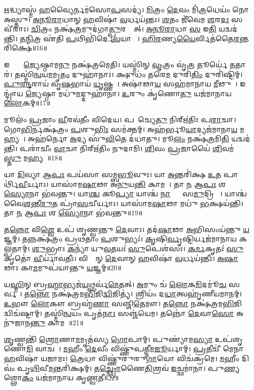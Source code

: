 \ul{𑌋}𑌦𑍍𑌧𑍍𑌯𑌾𑌸𑍍𑌮॑ \ul{𑌹}𑌵𑍍𑌯𑍈𑌰𑍍𑌨𑌮॑𑌸𑍋\ul{𑌪}𑌸𑌦𑍍𑌯॑। 
\ul{𑌮𑌿}𑌤𑍍𑌰𑌂 \ul{𑌦𑍇}𑌵𑌂 𑌮𑌿॑\ul{𑌤𑍍𑌰}𑌧𑍇𑌯𑌂॑ 𑌨𑍋 𑌅𑌸𑍍𑌤𑍁। 
\ul{𑌅}\ul{𑌨𑍂}\ul{𑌰𑌾}𑌧𑌾𑌨𑍍 \ul{𑌹}𑌵𑌿𑌷𑌾॑ \ul{𑌵}𑌰𑍍𑌧𑌯॑𑌨𑍍𑌤𑌃। 
\ul{𑌶}𑌤𑌂 𑌜𑍀॑𑌵𑍇𑌮 \ul{𑌶}𑌰\ul{𑌦𑌃} 𑌸𑌵𑍀॑𑌰𑌾𑌃। 
\ul{𑌚𑌿}𑌤𑍍𑌰𑌂 𑌨𑌕𑍍𑌷॑\ul{𑌤𑍍𑌰}𑌮𑍁𑌦॑𑌗𑌾\ul{𑌤𑍍𑌪𑍁}𑌰𑌸𑍍𑌤𑌾᳚𑌤𑍍। 
\ul{𑌅}\ul{𑌨𑍂}\ul{𑌰𑌾}𑌧𑌾 \ul{𑌸} 𑌇\ul{𑌤𑌿} 𑌯𑌦𑍍𑌵𑌦॑𑌨𑍍𑌤𑌿। 
𑌤\ul{𑌨𑍍𑌮𑌿}𑌤𑍍𑌰 𑌏॑𑌤𑌿 \ul{𑌪}𑌥𑌿𑌭𑌿॑𑌰𑍍𑌦𑍇\ul{𑌵}𑌯𑌾𑌨𑍈𑌃᳚। 
\ul{𑌹𑌿}\ul{𑌰}𑌣𑍍𑌯\ul{𑌯𑍈}𑌰𑍍𑌵𑌿𑌤॑𑌤𑍈\-\ul{𑌰}𑌨𑍍𑌤𑌰𑌿॑𑌕𑍍𑌷𑍇॥16॥ 

𑌇𑌨𑍍𑌦𑍍𑌰𑍋᳚ \ul{𑌜𑍍𑌯𑍇}𑌷𑍍𑌠𑌾𑌮\ul{𑌨𑍁} 𑌨𑌕𑍍𑌷॑𑌤𑍍𑌰𑌮𑍇𑌤𑌿। 
𑌯𑌸𑍍𑌮𑌿॑𑌨𑍍 \ul{𑌵𑍃}𑌤𑍍𑌰𑌂 𑌵𑍃॑\ul{𑌤𑍍𑌰} 𑌤𑍂𑌰𑍍𑌯𑍇॑ \ul{𑌤}𑌤𑌾𑌰॑। 
𑌤𑌸𑍍𑌮𑌿॑\ul{𑌨𑍍𑌵}𑌯\ul{𑌮}𑌮𑍃\ul{𑌤𑌂} 𑌦𑍁𑌹𑌾॑𑌨𑌾𑌃। 
𑌕𑍍𑌷𑍁𑌧𑌂॑ 𑌤𑌰𑍇\ul{𑌮} 𑌦𑍁𑌰𑌿॑\ul{𑌤𑌿𑌂} 𑌦𑍁𑌰𑌿॑𑌷𑍍𑌟𑌿𑌮𑍍। 
\ul{𑌪𑍁}\ul{𑌰}\ul{𑌨𑍍𑌦}𑌰𑌾𑌯॑ 𑌵𑍃\ul{𑌷}𑌭𑌾𑌯॑ \ul{𑌧𑍃}𑌷𑍍𑌣𑌵𑍇᳚। 
𑌅𑌷𑌾॑𑌢𑌾\ul{𑌯} 𑌸𑌹॑𑌮𑌾𑌨𑌾𑌯 \ul{𑌮𑍀}𑌢𑍁𑌷𑍇᳚। 
𑌇𑌨𑍍𑌦𑍍𑌰𑌾॑𑌯 \ul{𑌜𑍍𑌯𑍇}𑌷𑍍𑌠𑌾 𑌮𑌧𑍁॑\ul{𑌮}𑌦𑍍𑌦𑍁𑌹𑌾॑𑌨𑌾। 
\ul{𑌉}𑌰𑍁𑌂 𑌕𑍃॑𑌣𑍋\ul{𑌤𑍁} 𑌯𑌜॑𑌮𑌾𑌨𑌾𑌯 \ul{𑌲𑍋}𑌕𑌮𑍍॥17॥ 

𑌮𑍂𑌲𑌂॑ \ul{𑌪𑍍𑌰}𑌜𑌾𑌂 \ul{𑌵𑍀}𑌰𑌵॑𑌤𑍀𑌂 𑌵𑌿𑌦𑍇𑌯। 
𑌪𑌰𑌾᳚𑌚𑍍𑌯𑍇\ul{𑌤𑍁} 𑌨𑌿𑌰𑍍𑌋॑𑌤𑌿𑌃 𑌪\ul{𑌰𑌾}𑌚𑌾। 
𑌗𑍋\ul{𑌭𑌿}𑌰𑍍𑌨𑌕𑍍𑌷॑𑌤𑍍𑌰𑌂 \ul{𑌪}𑌶𑍁\ul{𑌭𑌿𑌃} 𑌸𑌮॑𑌕𑍍𑌤𑌮𑍍। 
𑌅𑌹॑𑌰𑍍𑌭𑍂\ul{𑌯𑌾}𑌦𑍍𑌯𑌜॑𑌮𑌾𑌨𑌾\ul{𑌯} 𑌮𑌹𑍍𑌯𑌮𑍍᳚। 
𑌅𑌹॑𑌰𑍍𑌨𑍋 \ul{𑌅}𑌦𑍍𑌯 𑌸𑍁॑\ul{𑌵𑌿}𑌤𑍇 𑌦॑𑌧𑌾𑌤𑍁। 
𑌮𑍂\ul{𑌲𑌂} 𑌨𑌕𑍍𑌷॑\ul{𑌤𑍍𑌰}𑌮𑌿\ul{𑌤𑌿} 𑌯𑌦𑍍𑌵𑌦॑𑌨𑍍𑌤𑌿। 
𑌪𑌰𑌾॑𑌚𑍀𑌂 \ul{𑌵𑌾}𑌚𑌾 𑌨𑌿𑌰𑍍𑌋॑𑌤𑌿𑌂 𑌨𑍁𑌦𑌾𑌮𑌿। 
\ul{𑌶𑌿}𑌵𑌂 \ul{𑌪𑍍𑌰}𑌜𑌾𑌯𑍈॑ \ul{𑌶𑌿}𑌵𑌮॑\ul{𑌸𑍍𑌤𑍁} 𑌮𑌹𑍍𑌯𑌮𑍍᳚॥18॥ 

𑌯𑌾 \ul{𑌦𑌿}𑌵𑍍𑌯𑌾 𑌆\ul{𑌪𑌃} 𑌪𑌯॑𑌸𑌾 𑌸𑌮𑍍𑌬\ul{𑌭𑍂}𑌵𑍁𑌃। 
𑌯𑌾 \ul{𑌅}𑌨𑍍𑌤𑌰𑌿॑𑌕𑍍𑌷 \ul{𑌉}𑌤 𑌪𑌾𑌰𑍍𑌥𑌿॑\ul{𑌵𑍀}𑌰𑍍𑌯𑌾𑌃। 
𑌯𑌾𑌸𑌾॑𑌮\ul{𑌷𑌾}𑌢𑌾 𑌅॑\ul{𑌨𑍁}𑌯\ul{𑌨𑍍𑌤𑌿} 𑌕𑌾𑌮𑌮𑍍᳚। 
𑌤𑌾 \ul{𑌨} 𑌆\ul{𑌪𑌃} 𑌶 \ul{𑌸𑍍𑌯𑍋}𑌨𑌾 𑌭॑𑌵𑌨𑍍𑌤𑍁। 
𑌯𑌾\ul{𑌶𑍍𑌚} 𑌕𑍂\ul{𑌪𑍍𑌯𑌾} 𑌯𑌾𑌶𑍍𑌚॑ \ul{𑌨𑌾}𑌦𑍍𑌯𑌾𑌃᳚ 𑌸\ul{𑌮𑍁}𑌦𑍍𑌰𑌿𑌯𑌾𑌃᳚। 
𑌯𑌾𑌶𑍍𑌚॑ 𑌵𑍈\ul{𑌶}𑌨𑍍𑌤𑍀\ul{𑌰𑍁}𑌤 𑌪𑍍𑌰𑌾॑\ul{𑌸}𑌚𑍀𑌰𑍍𑌯𑌾𑌃। 
𑌯𑌾𑌸𑌾॑𑌮\ul{𑌷𑌾}𑌢𑌾 𑌮𑌧𑍁॑ \ul{𑌭}𑌕𑍍𑌷𑌯॑𑌨𑍍𑌤𑌿। 
𑌤𑌾 \ul{𑌨} 𑌆\ul{𑌪𑌃} 𑌶 \ul{𑌸𑍍𑌯𑍋}𑌨𑌾 𑌭॑𑌵𑌨𑍍𑌤𑍁॥19॥ 

𑌤\ul{𑌨𑍍𑌨𑍋} 𑌵𑌿\ul{𑌶𑍍𑌵𑍇} 𑌉𑌪॑ 𑌶𑍃𑌣𑍍𑌵𑌨𑍍𑌤𑍁 \ul{𑌦𑍇}𑌵𑌾𑌃। 
𑌤𑌦॑\ul{𑌷𑌾}𑌢𑌾 \ul{𑌅}𑌭𑌿𑌸𑌂𑌯॑𑌨𑍍𑌤𑍁 \ul{𑌯}𑌜𑍍𑌞𑌮𑍍। 
𑌤𑌨𑍍𑌨𑌕𑍍𑌷॑𑌤𑍍𑌰𑌂 𑌪𑍍𑌰𑌥𑌤𑌾𑌂 \ul{𑌪}𑌶𑍁𑌭𑍍𑌯𑌃॑। 
\ul{𑌕𑍃}𑌷𑌿\ul{𑌰𑍍𑌵𑍃}𑌷𑍍𑌟𑌿𑌰𑍍𑌯𑌜॑𑌮𑌾𑌨𑌾𑌯 𑌕𑌲𑍍𑌪𑌤𑌾𑌮𑍍। 
\ul{𑌶𑍁}𑌭𑍍𑌰𑌾𑌃 \ul{𑌕}𑌨𑍍𑌯𑌾॑ 𑌯𑍁\ul{𑌵}𑌤𑌯𑌃॑ \ul{𑌸𑍁}𑌪𑍇𑌶॑𑌸𑌃। 
\ul{𑌕}\ul{𑌰𑍍𑌮}𑌕𑍃𑌤𑌃॑ \ul{𑌸𑍁}𑌕𑍃𑌤𑍋॑ \ul{𑌵𑍀}𑌰𑍍𑌯𑌾॑𑌵𑌤𑍀𑌃। 
𑌵𑌿𑌶𑍍𑌵𑌾᳚𑌨𑍍 \ul{𑌦𑍇}𑌵𑌾𑌨𑍍 \ul{𑌹}𑌵𑌿𑌷𑌾॑ \ul{𑌵}𑌰𑍍𑌧𑌯॑𑌨𑍍𑌤𑍀𑌃। 
\ul{𑌅}\ul{𑌷𑌾}𑌢𑌾𑌃 𑌕𑌾\ul{𑌮}𑌮𑍁𑌪॑𑌯𑌾𑌨𑍍𑌤𑍁 \ul{𑌯}𑌜𑍍𑌞𑌮𑍍॥20॥ 

𑌯\ul{𑌸𑍍𑌮𑌿}𑌨𑍍 𑌬𑍍𑌰\ul{𑌹𑍍𑌮𑌾}𑌭𑍍𑌯𑌜॑\ul{𑌯}𑌥𑍍𑌸𑌰𑍍𑌵॑\ul{𑌮𑍇}𑌤𑌤𑍍। 
\ul{𑌅}𑌮𑍁𑌂 𑌚॑ \ul{𑌲𑍋}𑌕\ul{𑌮𑌿}𑌦𑌮𑍂॑\ul{𑌚} 𑌸𑌰𑍍𑌵𑌮𑍍᳚। 
𑌤\ul{𑌨𑍍𑌨𑍋} 𑌨𑌕𑍍𑌷॑𑌤𑍍𑌰𑌮\ul{𑌭𑌿}𑌜𑌿\ul{𑌦𑍍𑌵𑌿}𑌜𑌿𑌤𑍍𑌯॑। 
𑌶𑍍𑌰𑌿𑌯𑌂॑ 𑌦\ul{𑌧𑌾}𑌤𑍍𑌵𑌹𑍃॑𑌣𑍀𑌯\-𑌮𑌾𑌨𑌮𑍍। 
\ul{𑌉}𑌭𑍗 \ul{𑌲𑍋}𑌕𑍗 𑌬𑍍𑌰𑌹𑍍𑌮॑\ul{𑌣𑌾} 𑌸𑌞𑍍𑌜𑌿॑\ul{𑌤𑍇}𑌮𑍗। 
𑌤\ul{𑌨𑍍𑌨𑍋} 𑌨𑌕𑍍𑌷॑𑌤𑍍𑌰𑌮\ul{𑌭𑌿}𑌜𑌿𑌦𑍍𑌵𑌿𑌚॑𑌷𑍍𑌟𑌾𑌮𑍍। 
𑌤𑌸𑍍𑌮𑌿॑\ul{𑌨𑍍𑌵}𑌯𑌂 𑌪𑍃𑌤॑\ul{𑌨𑌾𑌃} 𑌸𑌞𑍍𑌜॑𑌯𑍇𑌮। 
𑌤𑌨𑍍𑌨𑍋॑ \ul{𑌦𑍇}𑌵𑌾\ul{𑌸𑍋} 𑌅𑌨𑍁॑𑌜𑌾𑌨\ul{𑌨𑍍𑌤𑍁} 𑌕𑌾𑌮𑌮𑍍᳚॥21॥ 

\ul{𑌶𑍃}𑌣𑍍𑌵𑌨𑍍𑌤𑌿॑ \ul{𑌶𑍍𑌰𑍋}𑌣𑌾\ul{𑌮}𑌮𑍃𑌤॑𑌸𑍍𑌯 \ul{𑌗𑍋}𑌪𑌾𑌮𑍍। 
𑌪𑍁𑌣𑍍𑌯𑌾॑𑌮\ul{𑌸𑍍𑌯𑌾} 𑌉𑌪॑𑌶𑍃𑌣𑍋\ul{𑌮𑌿} 𑌵𑌾𑌚𑌮𑍍᳚। 
\ul{𑌮}𑌹𑍀𑌂 \ul{𑌦𑍇}𑌵𑍀𑌂 𑌵𑌿𑌷𑍍𑌣𑍁॑𑌪𑌤𑍍𑌨𑍀𑌮\ul{𑌜𑍂}𑌰𑍍𑌯𑌾𑌮𑍍। 
\ul{𑌪𑍍𑌰}𑌤𑍀𑌚𑍀॑ 𑌮𑍇𑌨𑌾 \ul{𑌹}𑌵𑌿𑌷𑌾॑ 𑌯𑌜𑌾𑌮𑌃। 
\ul{𑌤𑍍𑌰𑍇}𑌧𑌾 𑌵𑌿𑌷𑍍𑌣𑍁॑𑌰𑍁𑌰𑍁\ul{𑌗𑌾}𑌯𑍋 𑌵𑌿𑌚॑𑌕𑍍𑌰𑌮𑍇। 
\ul{𑌮}𑌹𑍀𑌂 𑌦𑌿𑌵𑌂॑ 𑌪𑍃\ul{𑌥𑌿}𑌵𑍀\ul{𑌮}𑌨𑍍𑌤𑌰𑌿॑𑌕𑍍𑌷𑌮𑍍। 
𑌤\ul{𑌚𑍍𑌛𑍍𑌰𑍋}𑌣𑍈\ul{𑌤𑌿}𑌶𑍍𑌰𑌵॑ \ul{𑌇}𑌚𑍍𑌛𑌮𑌾॑𑌨𑌾। 
𑌪𑍁\ul{𑌣𑍍𑌯}\ul{} 𑌶𑍍𑌲𑍋\ul{𑌕𑌂} 𑌯𑌜॑𑌮𑌾𑌨𑌾𑌯 𑌕𑍃\ul{𑌣𑍍𑌵}𑌤𑍀॥22॥ 

